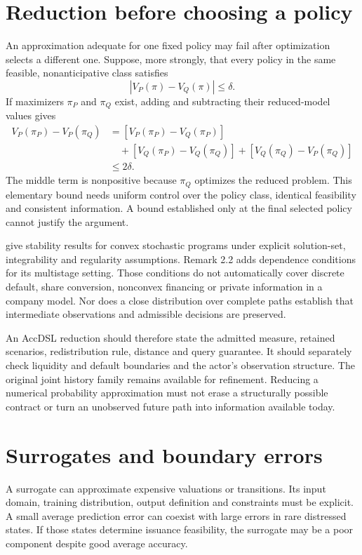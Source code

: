 \section{Reduction before choosing a policy}
An approximation adequate for one fixed policy may fail after optimization selects a different one. Suppose, more strongly, that every policy in the same feasible, nonanticipative class satisfies
\begin{equation}
 |V_P(\pi)-V_Q(\pi)|\leq\delta.
\end{equation}
If maximizers $\pi_P$ and $\pi_Q$ exist, adding and subtracting their reduced-model values gives
\begin{align}
 V_P(\pi_P)-V_P(\pi_Q)
 &= [V_P(\pi_P)-V_Q(\pi_P)]\nonumber\\
 &\quad+[V_Q(\pi_P)-V_Q(\pi_Q)]
       +[V_Q(\pi_Q)-V_P(\pi_Q)]\nonumber\\
 &\leq2\delta.
\end{align}
The middle term is nonpositive because $\pi_Q$ optimizes the reduced problem. This elementary bound needs uniform control over the policy class, identical feasibility and consistent information. A bound established only at the final selected policy cannot justify the argument.

\citet[Section 2]{dupacova2000preprint} give stability results for convex stochastic programs under explicit solution-set, integrability and regularity assumptions. Remark 2.2 adds dependence conditions for its multistage setting. Those conditions do not automatically cover discrete default, share conversion, nonconvex financing or private information in a company model. Nor does a close distribution over complete paths establish that intermediate observations and admissible decisions are preserved.

An AccDSL reduction should therefore state the admitted measure, retained scenarios, redistribution rule, distance and query guarantee. It should separately check liquidity and default boundaries and the actor's observation structure. The original joint history family remains available for refinement. Reducing a numerical probability approximation must not erase a structurally possible contract or turn an unobserved future path into information available today.

\section{Surrogates and boundary errors}
A surrogate can approximate expensive valuations or transitions. Its input domain, training distribution, output definition and constraints must be explicit. A small average prediction error can coexist with large errors in rare distressed states. If those states determine issuance feasibility, the surrogate may be a poor component despite good average accuracy.

